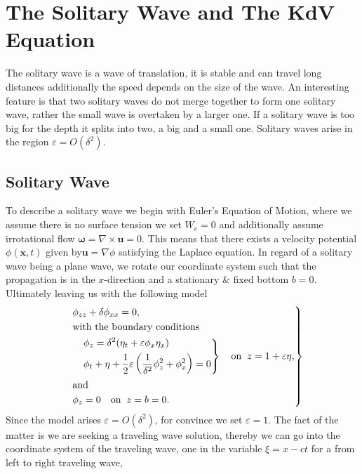 \section{The Solitary Wave and The KdV Equation}
The solitary wave is a wave of translation, it is stable and can travel long
distances additionally the speed depends on the size of the wave. An
interesting feature is that two solitary waves do not merge together to form
one solitary wave, rather the small wave is overtaken by a larger one. If a
solitary wave is too big for the depth it splits into two, a big and a small
one. Solitary waves arise in the region $\varepsilon=O(\delta^2)$.


\subsection{Solitary Wave}
To describe
a solitary wave we begin with Euler's Equation of Motion, where we assume
there is no surface tension we set $W_e = 0$ and additionally assume
irrotational flow $\mathbf{\omega}=\nabla \times  \mathbf{u} = 0$. This means
that there exists a velocity potential $\phi(\mathbf{x},t)$ given
by$\mathbf{u} = \nabla \phi$ satisfying the Laplace equation. In regard of a
solitary wave being a plane wave, we rotate our coordinate system such that
the propagation is in the $x$-direction and a stationary \& fixed bottom
$b=0$. Ultimately leaving us with the following model
\begin{align}\label{eq:soliton}
\begin{drcases}
   & \phi_{zz} + \delta \phi_{x x }  = 0,\\
   &\text{with the boundary conditions}\\
   &\begin{drcases}
    &\phi_z = \delta^2 (\eta_t + \varepsilon \phi_x \eta_x) \\
    &\phi_t + \eta +  \frac{1}{2}\varepsilon\left( \frac{1}{\delta^2}\phi^2_z
    + \phi_x^2\right)  =0
  \end{drcases}\quad \text{on}\;\; z = 1+\varepsilon\eta,\\
   &\text{and}\\
   & \phi_z =0 \quad \text{on}\;\; z = b = 0.
\end{drcases}
\end{align}
Since the model arises $\varepsilon = O(\delta^2)$, for convince we set
$\varepsilon=1$. The fact of the matter is we are seeking a traveling wave
solution, thereby we can go into the coordinate system of the traveling wave,
one in the variable $\xi = x - ct$ for a from left to right traveling wave,
